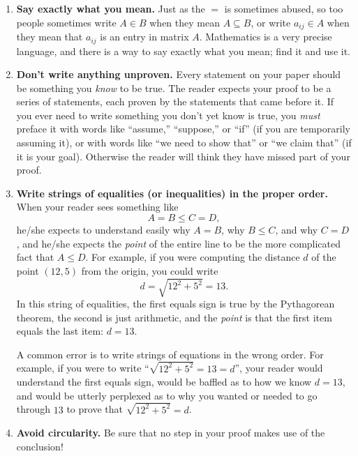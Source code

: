 \documentclass[11pt]{article}
\begin{document}
\begin{enumerate}
\item \textbf{Say exactly what you mean.}
        Just as the $=$ is sometimes abused,
        so too people sometimes write $A\in B$ when they mean $A\subseteq B$,
        or write $a_{ij}\in A$ when they mean that $a_{ij}$ is an entry in matrix $A$.
        Mathematics is a very precise language, and there is a way to say exactly what you mean;
        find it and use it.

\item \textbf{Don't write anything unproven.}
        Every statement on your paper should be something you \emph{know} to be true.
        The reader expects your proof to be a series of statements, each proven by the statements that came before it.
        If you ever need to write something you don't yet know is true,
        you \emph{must} preface it with words like ``assume,'' ``suppose,'' or ``if''
        (if you are temporarily assuming it),
        or with words like ``we need to show that'' or ``we claim that'' (if it is your goal).
        Otherwise the reader will think they have missed part of your proof.

\item \textbf{Write strings of equalities (or inequalities) in the proper order.}
        When your reader sees something like
        $$A=B\leq C=D,$$
        he/she expects to understand easily why $A=B$, why $B\leq C$, and why $C=D$,
        and he/she expects the \emph{point} of the entire line to be the more complicated fact that $A\leq D$.
        For example, if you were computing the distance $d$ of the point $(12,5)$ from the origin,
        you could write
        $$d = \sqrt{12^2+5^2} = 13.$$
        In this string of equalities, the first equals sign is true by the Pythagorean theorem, 
        the second is just arithmetic, and the \emph{point} is that the first item equals the last item: $d=13$.
        
        A common error is to write strings of equations in the wrong order.
        For example, if you were to write ``$\sqrt{12^2+5^2}=13=d$'',
        your reader would understand the first equals sign,
        would be baffled as to how we know $d=13$,
        and would be utterly perplexed as to why you wanted or needed to go through $13$ to prove that $\sqrt{12^2+5^2}=d$.

\item \textbf{Avoid circularity.}  Be sure that no step in your proof makes use of the conclusion!
        


\end{enumerate}
\end{document}
